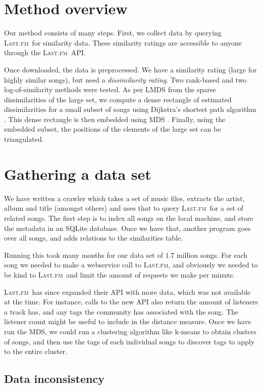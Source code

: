 \documentclass[10pt,fleqn,a4paper]{article}
\newcommand{\lastfm}{\textsc{Last.fm}}
\begin{document}
\begin{twocolumn}
\section{Method overview}

Our method consists of many steps. First, we collect data by querying \lastfm~for similarity data. These similarity ratings are accessible to anyone through the \lastfm~API.

Once downloaded, the data is preprocessed.  We have a similarity rating (large for highly similar songs), but need a \emph{dissimilarity rating}.   Two rank-based and two log-of-similarity methods were tested.  As per LMDS from the sparse dissimilarities of the large set, we compute a dense rectangle of estimated dissimilarities for a small subset of songs using Dijkstra's shortest path algorithm \cite{dijkstra}.  This dense rectangle is then embedded using MDS \cite{strickert2005htm}.  Finally, using the embedded subset, the positions of the elements of the large set can be triangulated.

\section{Gathering a data set} 

We have written a crawler which takes a set of music files, extracts the artist, album and title (amongst others) and uses that to query \lastfm~for a set of related songs. The first step is to index all songs on the local machine, and store the metadata in an SQLite database. Once we have that, another program goes over all songs, and adds relations to the similarities table.

Running this took many months for our data set of $1.7$ million songs. For each song we needed to make a webservice call to \lastfm, and obviously we needed to be kind to \lastfm~and limit the amount of requests we make per minute.

\lastfm~has since expanded their API with more data, which was not available at the time. For instance, calls to the new API also return the amount of listeners a track has, and any tags the community has associated with the song. The listener count might be useful to include in the distance measure. Once we have run the MDS, we could run a clustering algorithm like k-means to obtain clusters of songs, and then use the tags of each individual songs to discover tags to apply to the entire cluster.

\subsection{Data inconsistency}


\end{twocolumn}
\end{document}
